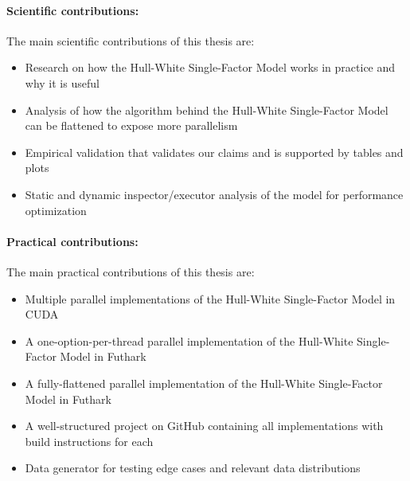 \paragraph{Scientific contributions:}
The main scientific contributions of this thesis are:
\begin{itemize}
    \item Research on how the Hull-White Single-Factor Model works in practice and why it is useful
    \item Analysis of how the algorithm behind the Hull-White Single-Factor Model can be flattened to expose more parallelism
    \item Empirical validation that validates our claims and is supported by tables and plots
    \item Static and dynamic inspector/executor analysis of the model for performance optimization 
\end{itemize}

\paragraph{Practical contributions:}
The main practical contributions of this thesis are:
\begin{itemize}
    \item Multiple parallel implementations of the Hull-White Single-Factor Model in CUDA
    \item A one-option-per-thread parallel implementation of the Hull-White Single-Factor Model in Futhark
    \item A fully-flattened parallel implementation of the Hull-White Single-Factor Model in Futhark
    \item A well-structured project on GitHub containing all implementations with build instructions for each
    \item Data generator for testing edge cases and relevant data distributions
\end{itemize}
	
	


